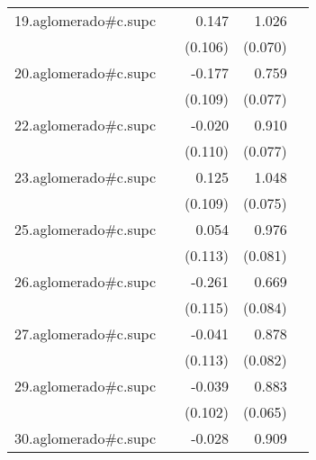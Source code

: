 {\begin{longtable}{l*{4}{D{.}{.}{-1}}}
\addlinespace
19.aglomerado#c.supc&                     &       0.147         &       1.026\sym{***}&                     \\
            &                     &     (0.106)         &     (0.070)         &                     \\
\addlinespace
20.aglomerado#c.supc&                     &      -0.177         &       0.759\sym{***}&                     \\
            &                     &     (0.109)         &     (0.077)         &                     \\
\addlinespace
22.aglomerado#c.supc&                     &      -0.020         &       0.910\sym{***}&                     \\
            &                     &     (0.110)         &     (0.077)         &                     \\
\addlinespace
23.aglomerado#c.supc&                     &       0.125         &       1.048\sym{***}&                     \\
            &                     &     (0.109)         &     (0.075)         &                     \\
\addlinespace
25.aglomerado#c.supc&                     &       0.054         &       0.976\sym{***}&                     \\
            &                     &     (0.113)         &     (0.081)         &                     \\
\addlinespace
26.aglomerado#c.supc&                     &      -0.261\sym{*}  &       0.669\sym{***}&                     \\
            &                     &     (0.115)         &     (0.084)         &                     \\
\addlinespace
27.aglomerado#c.supc&                     &      -0.041         &       0.878\sym{***}&                     \\
            &                     &     (0.113)         &     (0.082)         &                     \\
\addlinespace
29.aglomerado#c.supc&                     &      -0.039         &       0.883\sym{***}&                     \\
            &                     &     (0.102)         &     (0.065)         &                     \\
\addlinespace
30.aglomerado#c.supc&                     &      -0.028         &       0.909\sym{***}&                     \\

\end{longtable}}
